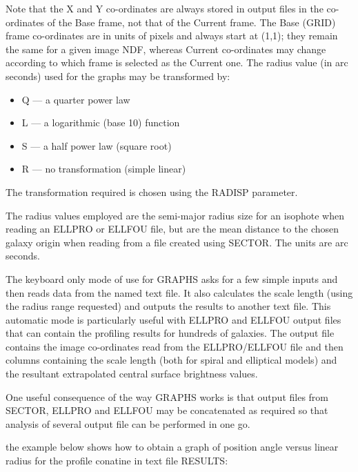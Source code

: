 \documentclass[twoside,11pt]{starlink}
\begin{document}
Note that the X and Y co-ordinates are always stored in output files
in the co-ordinates of the Base frame, not that of the Current frame.
The Base (GRID) frame co-ordinates are in units of pixels and
always start at (1,1); they remain the same for a given image NDF,
whereas Current co-ordinates may change according to which frame is
selected as the Current one.
The radius value (in arc seconds) used for the graphs may be transformed by:

\begin{itemize}
\item[] Q --- a quarter power law
\item[] L --- a logarithmic (base 10) function
\item[] S --- a half power law (square root)
\item[] R --- no transformation (simple linear)
\end{itemize}

The transformation required is chosen using the RADISP parameter.

The radius values employed are the semi-major radius size for an isophote
when reading an ELLPRO or ELLFOU file, but are the mean distance to the
chosen galaxy origin when reading from a file created using SECTOR. The
units are arc seconds.

The keyboard only mode of use for GRAPHS asks for a few simple inputs and then
reads data from the named text file. It also calculates the scale length
(using the radius range requested) and outputs the results to another text
file. This automatic mode is particularly useful with ELLPRO and ELLFOU
output files that can contain the profiling results for hundreds of galaxies.
The output file contains the image co-ordinates read from the ELLPRO/ELLFOU
file and then columns containing the scale length (both for spiral and
elliptical models) and the resultant extrapolated central surface
brightness values.

One useful consequence of the way GRAPHS works is that output files from
SECTOR, ELLPRO and ELLFOU may be concatenated as required so that
analysis of several output file can be performed in one go.

the example below shows how to obtain a graph of position angle versus linear
radius for the profile conatine in text file RESULTS:

\begin{terminalv}
\end{terminalv}
\end{document}
